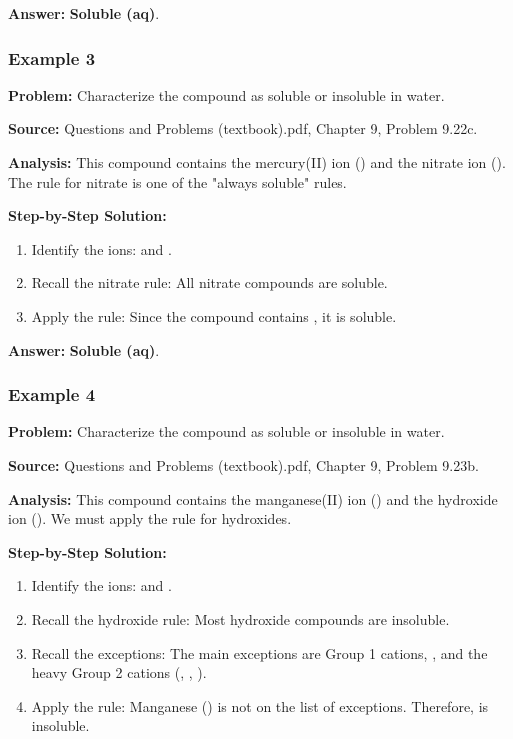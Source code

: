\documentclass{article}
\begin{document}
\textbf{Answer:} \textbf{Soluble (aq)}.

\subsubsection{Example 3}
\textbf{Problem:} Characterize the compound  as soluble or insoluble in water.

\textbf{Source:} Questions and Problems (textbook).pdf, Chapter 9, Problem 9.22c.

\textbf{Analysis:} This compound contains the mercury(II) ion () and the nitrate ion (). The rule for nitrate is one of the "always soluble" rules.

\textbf{Step-by-Step Solution:}
\begin{enumerate}
    \item Identify the ions:  and .
    \item Recall the nitrate rule: All nitrate compounds are soluble.
    \item Apply the rule: Since the compound contains , it is soluble.
\end{enumerate}

\textbf{Answer:} \textbf{Soluble (aq)}.

\subsubsection{Example 4}
\textbf{Problem:} Characterize the compound  as soluble or insoluble in water.

\textbf{Source:} Questions and Problems (textbook).pdf, Chapter 9, Problem 9.23b.

\textbf{Analysis:} This compound contains the manganese(II) ion () and the hydroxide ion (). We must apply the rule for hydroxides.

\textbf{Step-by-Step Solution:}
\begin{enumerate}
    \item Identify the ions:  and .
    \item Recall the hydroxide rule: Most hydroxide compounds are insoluble.
    \item Recall the exceptions: The main exceptions are Group 1 cations, , and the heavy Group 2 cations (, , ).
    \item Apply the rule: Manganese () is not on the list of exceptions. Therefore,  is insoluble.
\end{enumerate}
\end{document}
